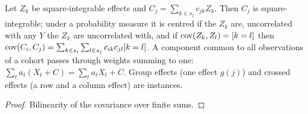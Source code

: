 \begin{lemma}\label{lem:Core_common}
  \leanok
  Let $Z_k$ be square-integrable effects and $C_j = \sum_{k \in s_j} c_{jk}Z_k$. Then $C_j$ is
  square-integrable; under a probability measure it is centred if the $Z_k$ are, uncorrelated
  with any $Y$ the $Z_k$ are uncorrelated with, and if $\operatorname{cov}(Z_k, Z_l) = [k = l]$ then
  $\operatorname{cov}(C_i, C_j) = \sum_{k \in s_i}\sum_{l \in s_j} c_{ik}c_{jl}[k = l]$. A component common to
  all observations of a cohort passes through weights summing to one:
  $\sum_t a_t(X_t + C) = \sum_t a_tX_t + C$. Group effects (one effect $g(j)$) and crossed effects
  (a row and a column effect) are instances.
\end{lemma}
\begin{proof}
  \leanok
  Bilinearity of the covariance over finite sums.
\end{proof}

